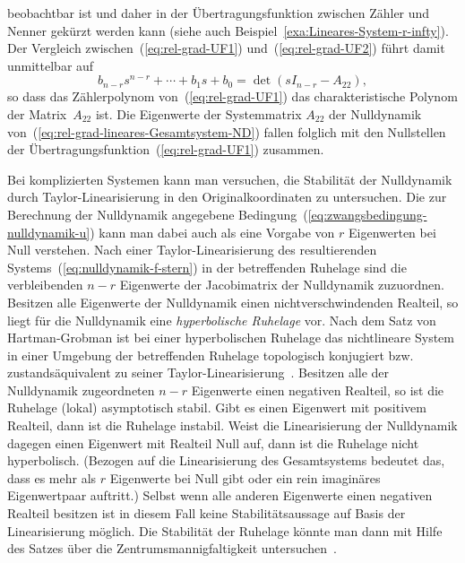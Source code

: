 \begin{remark}
beobachtbar ist und daher in der Übertragungsfunktion zwischen Zähler
und Nenner gekürzt werden kann (siehe auch Beispiel~\ref{exa:Lineares-System-r-infty}).
Der Vergleich zwischen~(\ref{eq:rel-grad-UF1}) und~(\ref{eq:rel-grad-UF2})
führt damit unmittelbar auf
\[
b_{n-r}s^{n-r}+\cdots+b_{1}s+b_{0}=\det\left(sI_{n-r}-A_{22}\right),
\]
so dass das Zählerpolynom von~(\ref{eq:rel-grad-UF1}) das charakteristische
Polynom der Matrix~$A_{22}$ ist. Die Eigenwerte der Systemmatrix
$A_{22}$ der Nulldynamik von~(\ref{eq:rel-grad-lineares-Gesamtsystem-ND})
fallen folglich mit den Nullstellen der Übertragungsfunktion~(\ref{eq:rel-grad-UF1})
zusammen.
\end{remark}

Bei komplizierten Systemen kann man versuchen, die Stabilität der
Nulldynamik durch Taylor-Linearisierung in den Originalkoordinaten
zu untersuchen. Die zur Berechnung der Nulldynamik angegebene Bedingung~(\ref{eq:zwangsbedingung-nulldynamik-u})
kann man dabei auch als eine Vorgabe von $r$ Eigenwerten bei Null
verstehen. Nach einer Taylor-Linearisierung des resultierenden Systems~(\ref{eq:nulldynamik-f-stern})
in der betreffenden Ruhelage sind die verbleibenden $n-r$ Eigenwerte
der Jacobi\-matrix der Nulldynamik zuzuordnen. Besitzen alle Eigenwerte
der Nulldynamik einen nichtverschwindenden Realteil, so liegt für
die Nulldynamik eine \emph{hyperbolische Ruhelage}
vor. Nach dem Satz von Hartman-Grobman
ist bei einer hyperbolischen Ruhelage das nichtlineare System in einer
Umgebung der betreffenden Ruhelage topologisch konjugiert
bzw. zustandsäquivalent zu seiner Taylor-Linearisierung~\cite{guckenheimer83,arrowsmith90}.
Besitzen alle der Nulldynamik zugeordneten $n-r$ Eigenwerte einen
negativen Realteil, so ist die Ruhelage (lokal) asymptotisch stabil.
Gibt es einen Eigenwert mit positivem Realteil, dann ist die Ruhelage
instabil. Weist die Linearisierung der Nulldynamik dagegen einen Eigenwert
mit Realteil Null auf, dann ist die Ruhelage nicht hyperbolisch. (Bezogen
auf die Linearisierung des Gesamtsystems bedeutet das, dass es mehr
als $r$ Eigenwerte bei Null gibt oder ein rein imaginäres Eigenwertpaar
auftritt.) Selbst wenn alle anderen Eigenwerte einen negativen Realteil
besitzen ist in diesem Fall keine Stabilitätsaussage auf Basis der
Linearisierung möglich. Die Stabilität der Ruhelage könnte man dann
mit Hilfe des Satzes über die Zentrumsmannigfaltigkeit
untersuchen~\cite{guckenheimer83,arrowsmith90}.
